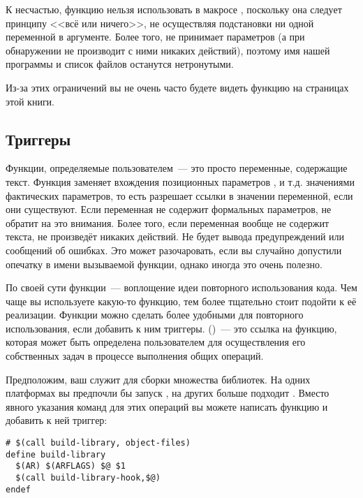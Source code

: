 К несчастью, функцию  нельзя использовать в макросе
, поскольку она следует принципу <<всё или
ничего>>, не осуществляя подстановки ни одной переменной в аргументе.
Более того,  не принимает параметров (а при
обнаружении не производит с ними никаких действий), поэтому имя нашей
программы и список файлов останутся нетронутыми.

Из-за этих ограничений вы не очень часто будете видеть функцию
 на страницах этой книги.

\subsection{Триггеры}

Функции, определяемые пользователем~--- это просто переменные,
содержащие текст. Функция  заменяет вхождения
позиционных параметров ,  и т.д.
значениями фактических параметров, то есть разрешает ссылки в значении
переменной, если они существуют. Если переменная не содержит
формальных параметров,  не обратит на это внимания.
Более того, если переменная вообще не содержит текста, 
не произведёт никаких действий.  Не будет вывода предупреждений или
сообщений об ошибках. Это может разочаровать, если вы случайно
допустили опечатку в имени вызываемой функции, однако иногда это очень
полезно.

По своей сути функции~--- воплощение идеи повторного использования
кода. Чем чаще вы используете какую-то функцию, тем более тщательно
стоит подойти к её реализации. Функции можно сделать более удобными
для повторного использования, если добавить к ним триггеры.
 ()~--- это ссылка на функцию, которая
может быть определена пользователем для осуществления его собственных
задач в процессе выполнения общих операций. 

Предположим, ваш \Makefile{} служит для сборки множества библиотек.
На одних платформах вы предпочли бы запуск , на других
больше подходит . Вместо явного указания команд для
этих операций вы можете написать функцию и добавить к ней триггер:

{\footnotesize
\begin{verbatim}
# $(call build-library, object-files)
define build-library
  $(AR) $(ARFLAGS) $@ $1
  $(call build-library-hook,$@)
endef
\end{verbatim}
}

